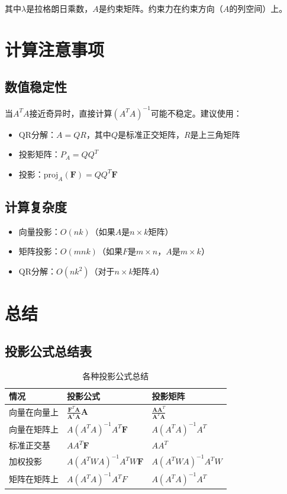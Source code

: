 \documentclass[12pt,a4paper]{article}
\begin{document}
其中$\lambda$是拉格朗日乘数，$A$是约束矩阵。约束力在约束方向（$A$的列空间）上。

\section{计算注意事项}

\subsection{数值稳定性}

当$A^T A$接近奇异时，直接计算$(A^T A)^{-1}$可能不稳定。建议使用：
\begin{itemize}
\item QR分解：$A = QR$，其中$Q$是标准正交矩阵，$R$是上三角矩阵
\item 投影矩阵：$P_A = Q Q^T$
\item 投影：$\text{proj}_{A}(\bm{F}) = Q Q^T \bm{F}$
\end{itemize}

\subsection{计算复杂度}

\begin{itemize}
\item 向量投影：$O(nk)$（如果$A$是$n \times k$矩阵）
\item 矩阵投影：$O(mnk)$（如果$F$是$m \times n$，$A$是$m \times k$）
\item QR分解：$O(nk^2)$（对于$n \times k$矩阵$A$）
\end{itemize}

\section{总结}

\subsection{投影公式总结表}

\begin{table}[h]
\centering
\begin{tabular}{|l|l|l|}
\hline
\textbf{情况} & \textbf{投影公式} & \textbf{投影矩阵} \\
\hline
向量在向量上 & $\frac{\bm{F}^T \bm{A}}{\bm{A}^T \bm{A}} \bm{A}$ & $\frac{\bm{A} \bm{A}^T}{\bm{A}^T \bm{A}}$ \\
\hline
向量在矩阵上 & $A (A^T A)^{-1} A^T \bm{F}$ & $A (A^T A)^{-1} A^T$ \\
\hline
标准正交基 & $A A^T \bm{F}$ & $A A^T$ \\
\hline
加权投影 & $A (A^T W A)^{-1} A^T W \bm{F}$ & $A (A^T W A)^{-1} A^T W$ \\
\hline
矩阵在矩阵上 & $A (A^T A)^{-1} A^T F$ & $A (A^T A)^{-1} A^T$ \\
\hline
\end{tabular}
\caption{各种投影公式总结}
\label{tab:projection_formulas}
\end{table}
\end{document}
